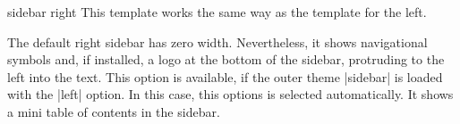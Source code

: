 \begin{element}{sidebar right}\yes\yes\yes
  This template works the same way as the template for the left.

  \begin{templateoptions}
    The default right sidebar has zero width. Nevertheless, it shows
    navigational symbols and, if installed, a logo at the bottom of
    the sidebar, protruding to the left into the text.
    This option is available, if the outer theme |sidebar| is loaded
    with the |left| option. In this case, this options is selected
    automatically. It shows a mini table of contents in the sidebar.
  \end{templateoptions}
\end{element}


